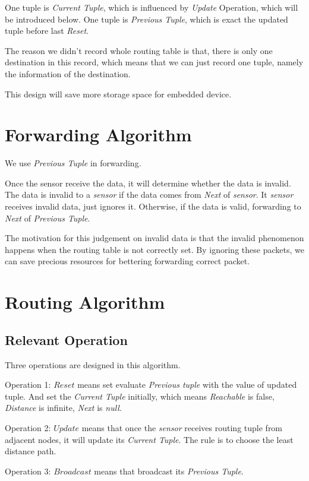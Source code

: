 \documentclass[a4paper]{article}
\begin{document}
One tuple is \emph{Current Tuple}, which is influenced by \emph{Update} Operation, which will be introduced below. One tuple is \emph{Previous Tuple}, which is exact the updated tuple before last \emph{Reset}.

The reason we didn't record whole routing table is that, there is only one destination in this record, which means that we can just record one tuple, namely the information of the destination.

This design will save more storage space for embedded device.

\section{Forwarding Algorithm}
We use \emph{Previous Tuple} in forwarding.

Once the sensor receive the data, it will determine whether the data is invalid. The data is invalid to a \emph{sensor} if the data comes from \emph{Next} of \emph{sensor}. It \emph{sensor} receives invalid data, just ignores it. Otherwise, if the data is valid, forwarding to \emph{Next} of \emph{Previous Tuple}.

The motivation for this judgement on invalid data is that the invalid phenomenon happens when the routing table is not correctly set. By ignoring these packets, we can save precious resources for bettering forwarding correct packet.

\section{Routing Algorithm}

\subsection{Relevant Operation}
Three operations are designed in this algorithm. 

Operation 1: $Reset$ means set evaluate \emph{Previous tuple} with the value of updated tuple. And set the \emph{Current Tuple} initially, which means \emph{Reachable} is false, \emph{Distance} is infinite, \emph{Next} is \emph{null}.

Operation 2: $Update$ means that once the \emph{sensor} receives routing tuple from adjacent nodes, it will update its \emph{Current Tuple}. The rule is to choose the least distance path.

Operation 3: $Broadcast$ means that broadcast its \emph{Previous Tuple}.
\end{document}
